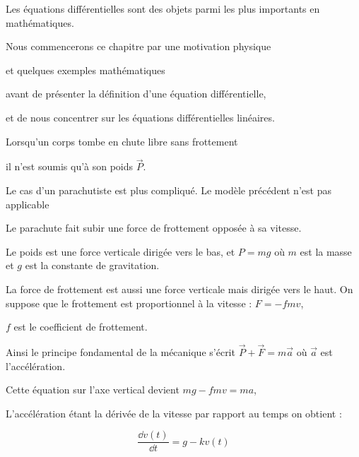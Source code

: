 







\debuttexte


\diapo

Les équations différentielles sont des objets parmi les plus importants en mathématiques.

\change
Nous commencerons ce chapitre par une motivation physique 

\change
et quelques exemples mathématiques

\change
avant de présenter la définition d'une équation différentielle,

\change
et de nous concentrer sur les équations différentielles linéaires.



\diapo

Lorsqu'un corps tombe en chute libre sans frottement 

\change
il n'est soumis qu'à son poids $\vec{P}$.

\change

Le cas d'un parachutiste est plus compliqué. 
Le modèle précédent n'est pas applicable

\change
Le parachute fait subir une force de frottement opposée à sa vitesse. 

\change
Le poids est une force verticale dirigée vers le bas, 
et $P = mg$ où $m$ est la masse et $g$ est la constante de gravitation.

\change
La force de frottement est aussi une force verticale mais dirigée vers le haut.
On suppose que le frottement est proportionnel
à la vitesse : $F = -fm v$,

$f$ est le coefficient de frottement.

\change
Ainsi le principe fondamental de la mécanique 
s'écrit $\vec{P}+\vec{F} = m\vec{a}$
où $\vec{a}$ est l'accélération.

\change
Cette équation sur l'axe vertical devient $mg - fmv = ma$, 

\change
L'accélération étant la dérivée de la vitesse par rapport au temps on obtient :

\begin{equation}
\frac{\dd v(t)}{\dd t} = g - kv(t)
\label{eq:para1}
\end{equation}

